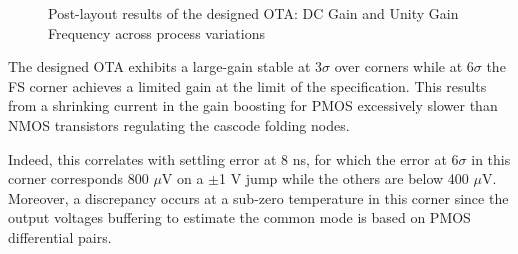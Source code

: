 \begin{figure}[htp]
    \centering
    \begin{subfigure}[b]{0.48\textwidth}
        \resizebox{\textwidth}{!}{
            
        }
        \label{fig:ota_dc_gain_temp_corners}
    \end{subfigure}
    \begin{subfigure}[b]{0.48\textwidth}
        \resizebox{\textwidth}{!}{
            
        }
        \label{fig:ota_dc_gain_temp_corners}
    \end{subfigure}
    \begin{subfigure}[b]{0.48\textwidth}
        \resizebox{\textwidth}{!}{
            
        }
        \label{fig:ota_ugf_temp_corners}
    \end{subfigure}
    \begin{subfigure}[b]{0.48\textwidth}
        \resizebox{\textwidth}{!}{
            
        }
        \label{fig:ota_ugf_1pF_temp_corners}
    \end{subfigure}
    \caption{Post-layout results of the designed OTA: DC Gain and Unity Gain Frequency across process variations}
    \label{fig:ota_result}
\end{figure}

The designed OTA exhibits a large-gain stable at \(3\sigma \) over corners while at \(6\sigma \) the FS corner achieves a limited gain at the limit of the specification. This results from a shrinking current in the gain boosting for PMOS excessively slower than NMOS transistors regulating the cascode folding nodes.

Indeed, this correlates with settling error at 8 ns, for which the error at \(6\sigma \) in this corner corresponds 800 \(\mu \)V on a \(\pm \)1 V jump while the others are below 400 \(\mu \)V. Moreover, a discrepancy occurs at a sub-zero temperature in this corner since the output voltages buffering to estimate the common mode is based on PMOS differential pairs.


